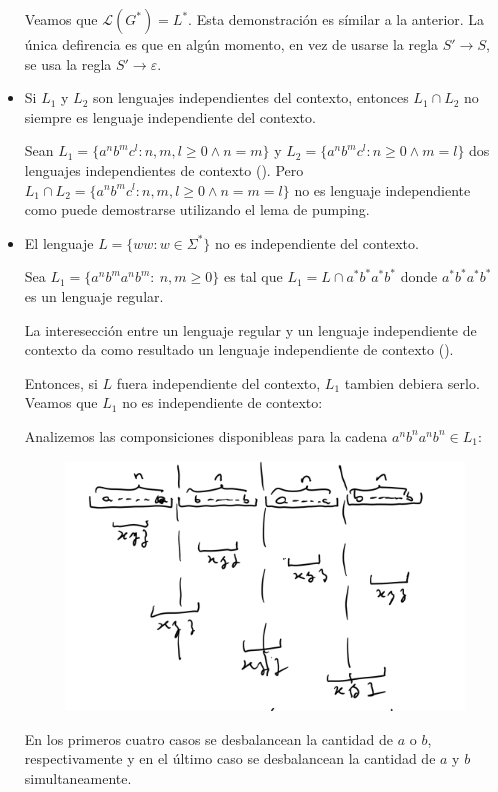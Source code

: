 \begin{itemize}
\begin{demo}[0.8\textwidth]
          Veamos que \(\mathcal{L}(G^*) = L^*\). Esta demonstración es símilar a la anterior. La única defirencia es que en algún momento, en vez de usarse la regla \(S'\to S\), se usa la regla \(S'\to \varepsilon\).
        \end{demo}
  \item Si \(L_1\) y \(L_2\) son lenguajes independientes del contexto, entonces \(L_1\cap L_2\) no siempre es lenguaje independiente del contexto.
        \begin{demo}[0.8\textwidth]
          Sean \(L_1 = \{ a^n b^m c^l: n,m,l \geq 0 \land n = m \}\) y \(L_2 = \{ a^n b^m c^l : n \geq 0 \land m = l \}\) dos lenguajes independientes de contexto ().
          Pero \(L_1\cap L_2 = \{ a^n b^m c^l : n,m,l \geq 0 \land n = m = l \}\) no es lenguaje independiente como puede demostrarse utilizando el lema de pumping.
        \end{demo}
  \item El lenguaje \(L = \{ ww : w \in \Sigma^* \}\) no es independiente del contexto.
        \begin{demo}[0.8\textwidth]
          Sea \(L_1 = \{ a^n b^m a^n b^m:~ n,m\geq 0\}\) es tal que \(L_1 = L \cap a^* b^* a^* b^*\)
          donde \(a^* b^* a^* b^*\) es un lenguaje regular.

          La interesección entre un lenguaje regular y un lenguaje independiente de contexto da como resultado  un lenguaje independiente de contexto ().

          Entonces, si \(L\) fuera independiente del contexto, \(L_1\) tambien debiera serlo. Veamos que \(L_1\) no es independiente de contexto:

          Analizemos las componsiciones disponibleas para la cadena \(a^n b^n a^n b^n \in L_1\):
          \begin{figure}[H]
            \begin{center}
              \includegraphics[scale=0.3]{imagenes/anbnanbn.png}
            \end{center}
          \end{figure}
          En los primeros cuatro casos se desbalancean la cantidad de \(a\) o \(b\), respectivamente y en el último caso se desbalancean la cantidad de \(a\) y \(b\) simultaneamente.
        \end{demo}
\end{itemize}

